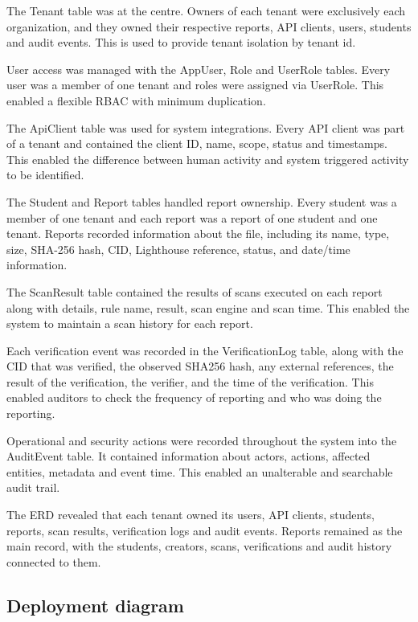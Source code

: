 The Tenant table was at the centre. Owners of each tenant were exclusively each organization, and they owned their respective reports, API clients, users, students and audit events. This is used to provide tenant isolation by tenant id.

User access was managed with the AppUser, Role and UserRole tables. Every user was a member of one tenant and roles were assigned via UserRole. This enabled a flexible RBAC with minimum duplication.

The ApiClient table was used for system integrations. Every API client was part of a tenant and contained the client ID, name, scope, status and timestamps. This enabled the difference between human activity and system triggered activity to be identified.

The Student and Report tables handled report ownership. Every student was a member of one tenant and each report was a report of one student and one tenant. Reports recorded information about the file, including its name, type, size, SHA-256 hash, CID, Lighthouse reference, status, and date/time information.

The ScanResult table contained the results of scans executed on each report along with details, rule name, result, scan engine and scan time. This enabled the system to maintain a scan history for each report.

Each verification event was recorded in the VerificationLog table, along with the CID that was verified, the observed SHA256 hash, any external references, the result of the verification, the verifier, and the time of the verification. This enabled auditors to check the frequency of reporting and who was doing the reporting.

Operational and security actions were recorded throughout the system into the AuditEvent table. It contained information about actors, actions, affected entities, metadata and event time. This enabled an unalterable and searchable audit trail.

The ERD revealed that each tenant owned its users, API clients, students, reports, scan results, verification logs and audit events. Reports remained as the main record, with the students, creators, scans, verifications and audit history connected to them.

\clearpage

\subsection{Deployment diagram}

